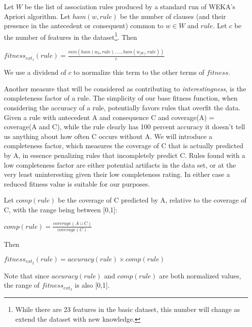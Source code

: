 \documentclass{amsart}
\theoremstyle{definition}
\theoremstyle{remark}
\numberwithin{equation}{section}
\begin{document}
\noindent Let $W$ be the list of association rules produced by a standard run of WEKA's Apriori algorithm.\newline \newline
Let $ham(w,rule)$ be the number of clauses (and their presence in the antecedent or consequent) common to $w\in W$ and  $rule$.\newline \newline
Let $c$ be the number of features in the dataset\footnote{While there are 23 features in the basic dataset, this number will change as extend the dataset with new knowledge.}.
Then\newline
\begin{center}
$fitness_{ext_1}(rule)=\frac{min(ham(w_0,rule),...,ham(w_{|W|},rule))}{c}$\newline
\end{center}
\noindent We use a dividend of $c$ to normalize this term to the other terms of $fitness$.\newline

Another measure that will be considered as contributing to \textit{interestingness}, is the completeness factor\cite{confusion} of a rule. The simplicity of our base fitness function, when considering the accuracy of a rule, potentially favors rules that overfit the data. Given a rule with antecedent A and consequence C and coverage(A) = coverage(A and C), while the rule clearly has 100 percent accuracy it doesn't tell us anything about how often C occurs without A. We will introduce a completeness factor, which measures the coverage of C that is actually predicted by A, in essence penalizing rules that incompletely predict C. Rules found with a low completeness factor are either potential artifacts in the data set, or at the very least uninteresting given their low completeness rating. In either case a reduced fitness value is suitable for our purposes.   
\newline

\noindent Let $comp(rule)$ be the coverage of C predicted by A, relative to the coverage of C, with the range being between [0,1]:
\begin{center}
$comp(rule)=\frac{coverage(A\cup C)}{coverage(C)}$
\end{center}
Then \newline
\begin{center}
$fitness_{ext_2}(rule)= accuracy(rule) \times comp(rule) $\newline
\end{center}
\noindent Note that since $accuracy(rule)$ and $comp(rule)$ are both normalized values, the range of $fitness_{ext_2}$ is also [0,1].\newline
\end{document}
